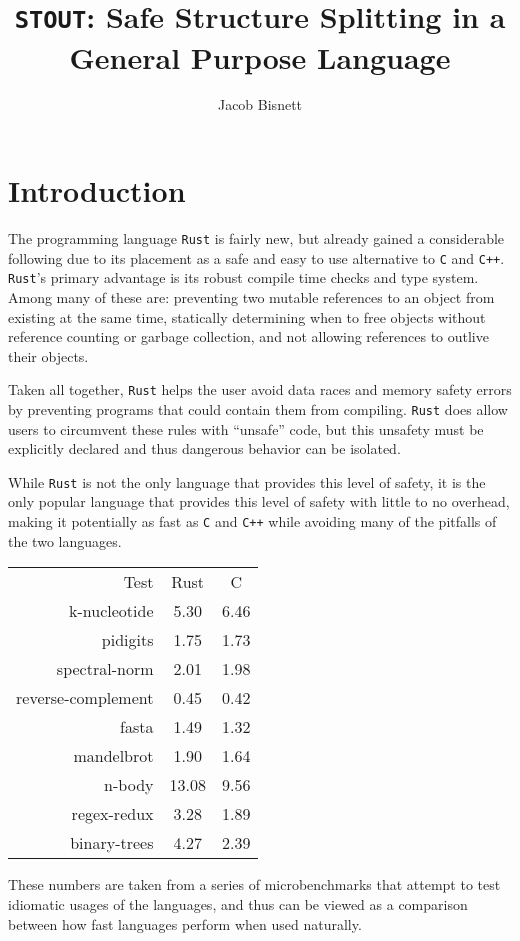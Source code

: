 \documentclass[12pt,oneside]{book}
\newcommand{\rustname}{{\texttt{Rust}}}
\def \rust {\rustname{}\xspace}
\newcommand{\cname}{{\texttt{C}}}
\def \c {\cname{}\xspace}
\newcommand{\cppname}{{\texttt{C++}}}
\def \cpp {\cppname{}\xspace}
\newcommand{\projectname}{{\texttt{STOUT}}}
\def \name{\projectname\xspace}
\begin{document}
\title{\name: Safe Structure Splitting in a General Purpose Language}
\author{Jacob Bisnett}
\maketitle
\pagestyle{fancy}
\chapter{Introduction}
\doublespacing
\label{sec:intro}

The programming language \rust is fairly new, but already gained a considerable
following due to its placement as a safe and easy to use alternative to \c and
\cpp. \rust's primary advantage is its robust compile time checks and type
system. Among many of these are:
preventing two mutable references to an object from existing at the same time, 
statically determining when to free objects without reference counting or
garbage collection,
and not allowing references to outlive their objects.

Taken all together, \rust helps the user avoid data races and memory safety
errors by preventing programs that could contain them from compiling.
\rust does allow users to circumvent these rules with ``unsafe'' code,
but this unsafety must be explicitly declared and thus dangerous behavior can be
isolated.

While \rust is not the only language that provides this level of safety, it is
the only popular language that provides this level of safety with little to no overhead,
making it potentially as fast as \c and \cpp while avoiding many of the
pitfalls of the two languages.

\begin{listing}
  \centering
\begin{tabular}{r|c|c}
  Test&Rust&C\\
  k-nucleotide&5.30&6.46\\
  pidigits&1.75&1.73\\
  spectral-norm&2.01&1.98\\
  reverse-complement&0.45&0.42\\
  fasta&1.49&1.32\\
  mandelbrot&1.90&1.64\\
  n-body&13.08&9.56\\
  regex-redux&3.28&1.89\\
  binary-trees&4.27&2.39\\
\end{tabular}

  These numbers are taken from a series of microbenchmarks that attempt to 
  test idiomatic usages of the languages, and thus can be viewed as a comparison
  between how fast languages perform when used naturally.\cite{bench}
  \caption{Rust vs C Microbenchmarks}
  \label{fig:bench}
\end{listing}
\end{document}

